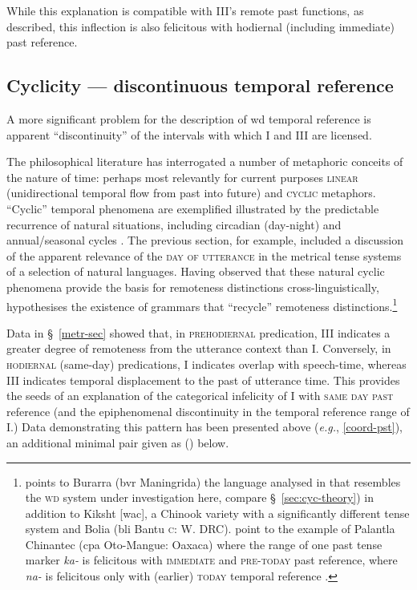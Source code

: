 While this explanation is compatible with \gls{III}'s remote past functions, as described, this inflection is also felicitous with hodiernal (including immediate) past reference. 

\subsection{Cyclicity --- discontinuous temporal reference}


A more significant problem for the description of \gls{wd} temporal reference is apparent ``discontinuity'' of the intervals with which \gls{I} and \gls{III} are licensed.

The philosophical literature has interrogated a number of metaphoric conceits of the nature of time: perhaps most relevantly for current purposes \textsc{linear} (unidirectional temporal flow from past into future) and \textsc{cyclic} metaphors. ``Cyclic'' temporal phenomena are exemplified illustrated by the predictable recurrence of natural situations, including circadian (day-night) and annual/seasonal cycles \citetext{\textit{e.g.}, discussion in \citealp{Whitrow1980} and \citealp{Fraser1987}}. The previous section, for example, included a discussion of the apparent relevance of the \textsc{day of utterance} in the metrical tense systems of a selection of natural languages. Having observed that these natural cyclic phenomena provide the basis for remoteness distinctions cross-linguistically, \citet[88]{Comrie1985} hypothesises the existence of grammars that ``recycle'' remoteness distinctions.\footnote{\label{xlingcyc}\citet{Comrie1985} points to Burarra (\gls{bvr} Maningrida) the language analysed in \citet{Glasgow1964} that resembles the \textsc{wd} system under investigation here, compare \S~\ref{sec:cyc-theory}) in addition to Kiksht [\gls{wac}], a Chinook variety with a significantly different tense system \citetext{see \citet[§~7]{Botne2012} for an overview of apparent reflexes of cyclic tense in the Kiksht system and similar systems in Mituku (\gls{zmq} Bantu \textsc{d}: E. DRC)} and Bolia (\gls{bli} Bantu \textsc{c}: W. DRC). \citet[104]{Bybee1994} point to the example of Palantla Chinantec (\gls{cpa} Oto-Mangue: Oaxaca) where the range of one past tense marker \textit{ka-} is felicitous with \textsc{immediate} and \textsc{pre-today} past reference, where \textit{na-} is felicitous only with (earlier) \textsc{today} temporal reference \citep[according to][25]{Merrifield1968}.}

Data in \S~\ref{metr-sec} showed that, in \textsc{prehodiernal} predication, \gls{III} indicates a greater degree of remoteness from the utterance context than \gls{I}. Conversely, in \textsc{hodiernal} (same-day) predications, \gls{I} indicates overlap with speech-time, whereas \gls{III} indicates temporal displacement to the past of utterance time. This provides the seeds of an explanation of the categorical infelicity of \gls{I} with \textsc{same day past} reference (and the epiphenomenal discontinuity in the temporal reference range of \gls{I}.) Data demonstrating this pattern has been presented above (\textit{e.g.}, \ref{coord-pst}), an additional minimal pair given as () below.

